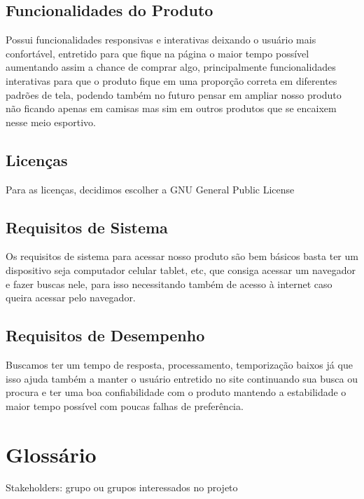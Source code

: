 \documentclass{article}
\begin{document}
\subsection{Funcionalidades do Produto}
Possui funcionalidades responsivas e interativas deixando o usuário mais confortável, entretido para que fique na página o maior tempo possível aumentando assim a chance de comprar algo, principalmente funcionalidades interativas para que o produto fique em uma proporção correta em diferentes padrões de tela, podendo também no futuro pensar em ampliar nosso produto não ficando apenas em camisas mas sim em outros produtos que se encaixem nesse meio esportivo.

\subsection{Licenças}
Para as licenças, decidimos escolher a GNU General Public License


\subsection{Requisitos de Sistema}
Os requisitos de sistema para acessar nosso produto são bem básicos basta ter um dispositivo seja computador celular tablet, etc, que consiga acessar um navegador e fazer buscas nele, para isso necessitando também de acesso à internet caso queira acessar pelo navegador.

\subsection{Requisitos de Desempenho}
Buscamos ter um tempo de resposta, processamento, temporização baixos já que isso ajuda também a manter o usuário entretido no site continuando sua busca ou procura e ter uma boa confiabilidade com o produto mantendo a estabilidade o maior tempo possível com poucas falhas de preferência.

\section{Glossário}
 Stakeholders: grupo ou grupos interessados no projeto

% 
% 
\end{document}
